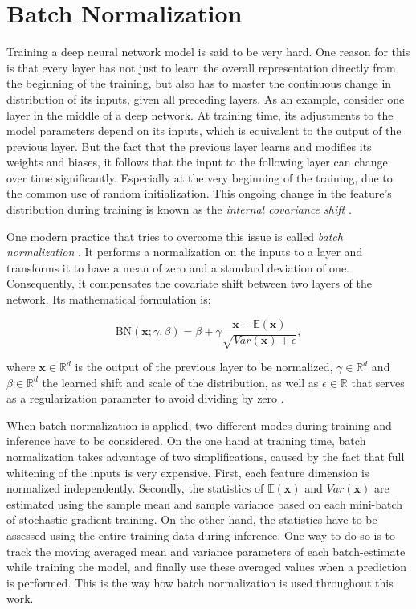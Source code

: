 \section{Batch Normalization}

Training a deep neural network model is said to be very hard. One reason for this is that every layer has not just to learn the overall representation directly from the beginning of the training, but also has to master the continuous change in distribution of its inputs, given all preceding layers. As an example, consider one layer in the middle of a deep network. At training time, its adjustments to the model parameters depend on its inputs, which is equivalent to the output of the previous layer. But the fact that the previous layer learns and modifies its weights and biases, it follows that the input to the following layer can change over time significantly. Especially at the very beginning of the training, due to the common use of random initialization. This ongoing change in the feature's distribution during training is known as the \textit{internal covariance shift} \parencite{rnn-batchnorm}.

One modern practice that tries to overcome this issue is called \textit{batch normalization} \parencite{batchnorm}. It performs a normalization on the inputs to a layer and transforms it to have a mean of zero and a standard deviation of one. Consequently, it compensates the covariate shift between two layers of the network. Its mathematical formulation is:

\begin{equation} \label{eq:bn}
\textrm{BN}(\textbf{x}; \gamma, \beta) = \beta + \gamma \frac{\textbf{x} - \mathbb{E}(\textbf{x})}{\sqrt{Var(\textbf{x}) + \epsilon}} ,
\end{equation}

where $ \textbf{x} \in \mathbb{R}^d $ is the output of the previous layer to be normalized, $\gamma \in \mathbb{R}^d $ and $\beta \in \mathbb{R}^d $ the learned shift and scale of the distribution, as well as $\epsilon \in \mathbb{R} $ that serves as a regularization parameter to avoid dividing by zero \parencite{rnn-batchnorm}.

When batch normalization is applied, two different modes during training and inference have to be considered. On the one hand at training time, batch normalization takes advantage of two simplifications, caused by the fact that full whitening of the inputs is very expensive. First, each feature dimension is normalized independently. Secondly, the statistics of $ \mathbb{E}(\textbf{x}) $ and $ Var(\textbf{x}) $ are estimated using the sample mean and sample variance based on each mini-batch of stochastic gradient training. On the other hand, the statistics have to be assessed using the entire training data during inference. One way to do so is to track the moving averaged mean and variance parameters of each batch-estimate while training the model, and finally use these averaged values when a prediction is performed. This is the way how batch normalization is used throughout this work.

